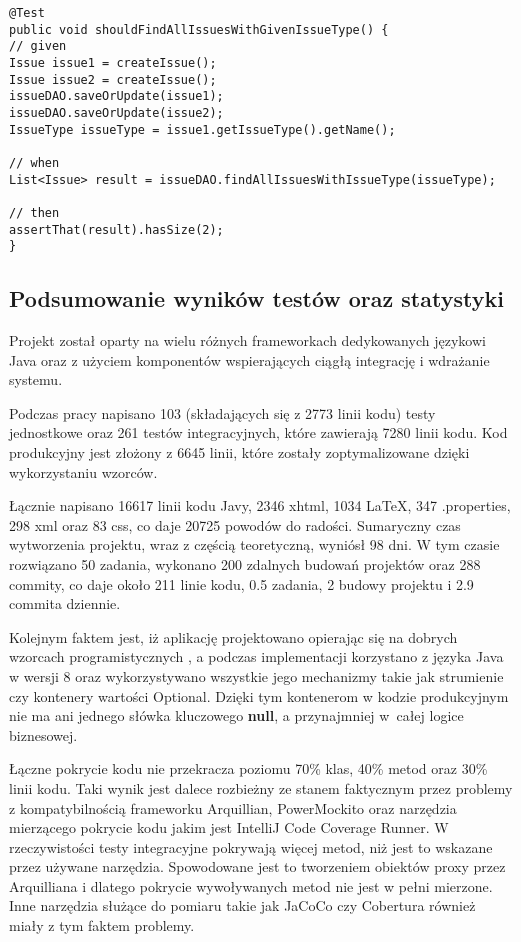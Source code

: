 \begin{lstlisting}[caption={Przykład testu integracyjnego}, label=lis:integ, numbers=none]
@Test
public void shouldFindAllIssuesWithGivenIssueType() {
// given
Issue issue1 = createIssue();
Issue issue2 = createIssue();
issueDAO.saveOrUpdate(issue1);
issueDAO.saveOrUpdate(issue2);
IssueType issueType = issue1.getIssueType().getName();

// when
List<Issue> result = issueDAO.findAllIssuesWithIssueType(issueType);

// then
assertThat(result).hasSize(2);
}\end{lstlisting}


\subsection{Podsumowanie wyników testów oraz statystyki}
Projekt został oparty na wielu różnych frameworkach dedykowanych językowi Java oraz z użyciem komponentów wspierających ciągłą integrację i wdrażanie systemu.

Podczas pracy napisano 103 (składających się z 2773 linii kodu) testy jednostkowe oraz 261 testów integracyjnych, które zawierają 7280 linii kodu. Kod produkcyjny jest złożony z 6645 linii, które zostały zoptymalizowane dzięki wykorzystaniu wzorców. 

Łącznie napisano 16617 linii kodu Javy, 2346 xhtml, 1034 \LaTeX, 347 .properties, 298 xml oraz 83 css, co daje 20725 powodów do radości.  Sumaryczny czas wytworzenia projektu, wraz z częścią teoretyczną, wyniósł 98 dni. W tym czasie rozwiązano 50 zadania, wykonano 200 zdalnych budowań projektów oraz 288 commity, co daje około 211 linie kodu, 0.5 zadania, 2 budowy projektu i 2.9 commita dziennie.

Kolejnym faktem jest, iż aplikację projektowano opierając się na dobrych wzorcach programistycznych \cite{CLEAN_CODE}\cite{REFACTOR}\cite{CI}, a podczas implementacji korzystano z języka Java w wersji 8 oraz wykorzystywano wszystkie jego mechanizmy takie jak strumienie czy kontenery wartości Optional. Dzięki tym kontenerom w kodzie produkcyjnym nie ma ani jednego słówka kluczowego \textbf{null}, a przynajmniej w~całej logice biznesowej.

Łączne pokrycie kodu nie przekracza poziomu 70\% klas, 40\% metod oraz 30\% linii kodu. Taki wynik jest dalece rozbieżny ze stanem faktycznym przez problemy z kompatybilnością frameworku Arquillian, PowerMockito oraz narzędzia mierzącego pokrycie kodu jakim jest IntelliJ Code Coverage Runner. W rzeczywistości testy integracyjne pokrywają więcej metod, niż jest to wskazane przez używane narzędzia. Spowodowane jest to tworzeniem obiektów proxy przez Arquilliana i dlatego pokrycie wywoływanych metod nie jest w pełni mierzone. Inne narzędzia służące do pomiaru takie jak JaCoCo czy Cobertura również miały z tym faktem problemy.
